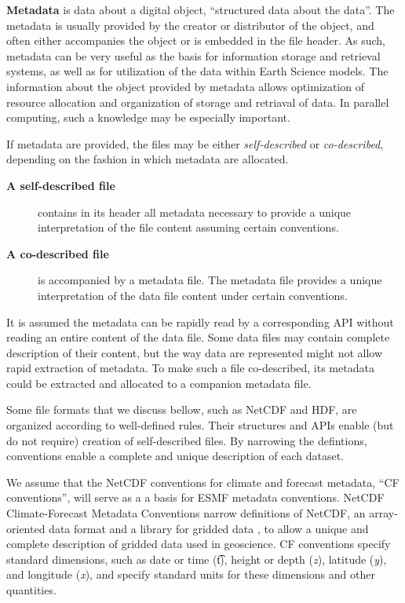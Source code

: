 {\bf Metadata} is data about a digital object, ``structured data about the 
data''. The metadata is usually provided by the creator or distributor of 
the object, and often either accompanies the object or is embedded in the 
file header. As such, metadata can be very useful as the basis for 
information storage and retrieval systems, as well as for utilization of the 
data within Earth Science models.
The information about the object provided by metadata allows optimization of  
resource allocation and organization of storage and retriaval of data. In 
parallel computing, such a knowledge may be especially important. 

If metadata are provided, the files may be either {\em self-described} or
{\em co-described}, depending on the fashion in which metadata are allocated.
\begin{description}
\item[\bf A self-described file] contains in its header all metadata 
necessary to provide a unique interpretation of the file content
assuming certain conventions.  
\item[\bf A co-described file] is accompanied by a metadata file. The
metadata file provides a unique interpretation of the data file content
under certain conventions. 
\end{description}
It is assumed the metadata can be rapidly read by a corresponding API without 
reading an entire content of the data file. Some data files may contain 
complete description of their content, but the way data are represented might 
not allow rapid extraction of metadata. To make such a file co-described, its 
metadata could be extracted and allocated to a companion metadata file.

Some file formats that we discuss bellow, such as NetCDF and HDF, are 
organized according to well-defined rules. Their structures and APIs enable 
(but do not require) creation of self-described files. By narrowing 
the defintions, conventions enable a complete and unique description of each 
dataset.

We assume that the NetCDF conventions for climate and forecast metadata, 
``CF conventions'', will serve as a a basis for ESMF metadata conventions.
 NetCDF Climate-Forecast Metadata Conventions
\cite{NetCDF_CF_v1_beta3} narrow definitions of NetCDF, an
array-oriented data format and a library for gridded data 
\cite{NetCDF3_UsersGuide_C}, to allow a unique and complete description
of gridded data used in geoscience. CF conventions specify standard 
dimensions, such as date or time ({\t t}), height or depth ({\it z}), 
latitude ({\it y}), and longitude ({\it x}), and specify standard
units for these dimensions and other quantities. 

